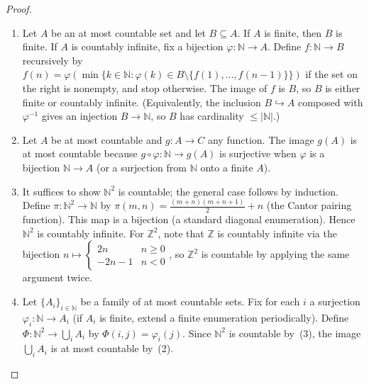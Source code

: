 \begin{proof}
    \begin{enumerate}
        \item Let $A$ be an at most countable set and let $B \subseteq A$. If $A$ is finite, then $B$ is finite. If $A$ is countably infinite, fix a bijection $\varphi : \mathbb{N} \to A$. Define $f : \mathbb{N} \to B$ recursively by $f(n) = \varphi(\min\{k \in \mathbb{N} : \varphi(k) \in B \setminus \{f(1),\dots,f(n-1)\}\})$ if the set on the right is nonempty, and stop otherwise. The image of $f$ is $B$, so $B$ is either finite or countably infinite. (Equivalently, the inclusion $B \hookrightarrow A$ composed with $\varphi^{-1}$ gives an injection $B \to \mathbb{N}$, so $B$ has cardinality $\leq |\mathbb{N}|$.)

        \item Let $A$ be at most countable and $g : A \to C$ any function. The image $g(A)$ is at most countable because $g \circ \varphi : \mathbb{N} \to g(A)$ is surjective when $\varphi$ is a bijection $\mathbb{N} \to A$ (or a surjection from $\mathbb{N}$ onto a finite $A$).

        \item It suffices to show $\mathbb{N}^2$ is countable; the general case follows by induction. Define $\pi : \mathbb{N}^2 \to \mathbb{N}$ by $\pi(m,n) = \frac{(m+n)(m+n+1)}{2} + n$ (the Cantor pairing function). This map is a bijection (a standard diagonal enumeration). Hence $\mathbb{N}^2$ is countably infinite. For $\mathbb{Z}^2$, note that $\mathbb{Z}$ is countably infinite via the bijection $n \mapsto \begin{cases} 2n & n \ge 0 \\ -2n-1 & n < 0 \end{cases}$, so $\mathbb{Z}^2$ is countable by applying the same argument twice.

        \item Let $\{A_i\}_{i \in \mathbb{N}}$ be a family of at most countable sets. Fix for each $i$ a surjection $\varphi_i : \mathbb{N} \to A_i$ (if $A_i$ is finite, extend a finite enumeration periodically). Define $\Phi : \mathbb{N}^2 \to \bigcup_i A_i$ by $\Phi(i,j) = \varphi_i(j)$. Since $\mathbb{N}^2$ is countable by~(3), the image $\bigcup_i A_i$ is at most countable by~(2).
    \end{enumerate}
\end{proof}